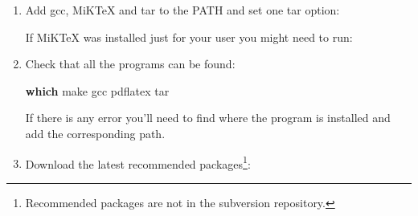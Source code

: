 \documentclass[
]{book}
\newenvironment{Shaded}{\begin{snugshade}}{\end{snugshade}}
\newcommand{\AttributeTok}[1]{\textcolor[rgb]{0.13,0.29,0.53}{#1}}
\newcommand{\BuiltInTok}[1]{#1}
\newcommand{\FunctionTok}[1]{\textcolor[rgb]{0.13,0.29,0.53}{\textbf{#1}}}
\newcommand{\NormalTok}[1]{#1}
\newcommand{\OperatorTok}[1]{\textcolor[rgb]{0.81,0.36,0.00}{\textbf{#1}}}
\newcommand{\StringTok}[1]{\textcolor[rgb]{0.31,0.60,0.02}{#1}}
\newcommand{\VariableTok}[1]{\textcolor[rgb]{0.00,0.00,0.00}{#1}}
\begin{document}
\begin{enumerate}
\begin{Shaded}
\end{Shaded}
\item
  Add gcc, MiKTeX and tar to the PATH and set one tar option:

\begin{Shaded}
\end{Shaded}

  If MiKTeX was installed just for your user you might need to run:

\begin{Shaded}
\end{Shaded}
\item
  Check that all the programs can be found:

\begin{Shaded}
\begin{Highlighting}[]
\FunctionTok{which}\NormalTok{ make gcc pdflatex tar}
\end{Highlighting}
\end{Shaded}

  If there is any error you'll need to find where the program is installed and add the corresponding path.
\item
  Download the latest recommended packages\footnote{Recommended packages are not in the subversion repository.}:


\end{enumerate}
\end{document}
